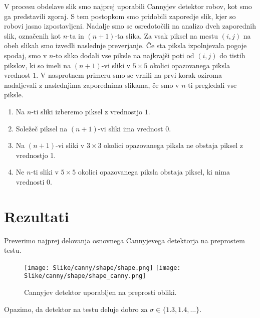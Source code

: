 \documentclass{article}
\begin{document}
    V procesu obdelave slik smo najprej uporabili Cannyjev detektor robov, kot smo ga predstavili zgoraj. 
    S tem postopkom smo pridobili zaporedje slik, kjer so robovi jasno izpostavljeni. Nadalje smo se osredotočili
    na analizo dveh zaporednih slik, označenih kot $n$-ta in $(n+1)$-ta slika. Za vsak piksel na mestu 
    $(i, j)$ na obeh slikah smo izvedli naslednje preverjanje. Če sta piksla izpolnjevala pogoje spodaj, smo v $n$-to 
    sliko dodali vse piksle na najkrajši poti od $(i, j)$ do tistih pikslov, ki so imeli na $(n+1)$-vi sliki v 
    $5 \times 5$ okolici opazovanega piksla vrednost $1$. V nasprotnem primeru smo se vrnili na prvi korak oziroma 
    nadaljevali z naslednjima zaporednima slikama, če smo v $n$-ti pregledali vse piksle.
    
    \begin{enumerate}
        \item Na $n$-ti sliki izberemo piksel z vrednostjo $1$.
        \item Soležeč piksel na $(n+1)$-vi sliki ima vrednost $0$.
        \item Na $(n+1)$-vi sliki v $3 \times 3$ okolici opazovanega piksla ne obstaja piksel z vrednostjo 1.
        \item Ne $n$-ti sliki v $5 \times 5$ okolici opazovanega piksla obstaja piksel, ki nima vrednosti 0.
    \end{enumerate}

    \section{Rezultati}
    Preverimo najprej delovanja osnovnega Cannyjevega detektorja na preprostem testu.
    \begin{figure}[H]
        \centering
        \texttt{[image: Slike/canny/shape/shape.png]} 
        \texttt{[image: Slike/canny/shape/shape\_canny.png]}
        \caption{Cannyjev detektor uporabljen na preprosti obliki.}
        \label{shape}
    \end{figure}
    Opazimo, da detektor na testu deluje dobro za $\sigma \in \{ 1.3, 1.4, \dots \}$.
\end{document}
